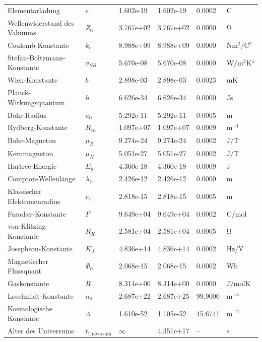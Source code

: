 \documentclass[12pt,a4paper]{report}
\begin{document}
\begin{longtable}{>{\raggedright}p{4.0cm}p{1.2cm}p{1.8cm}p{2.0cm}p{1.6cm}p{2.0cm}}
		Elementarladung & $e$ & 1.602e-19 & 1.602e-19 & 0.0002 & $\si{\coulomb}$ \\
		Wellenwiderstand des Vakuums & $Z_0$ & 3.767e+02 & 3.767e+02 & 0.0000 & $\si{\ohm}$ \\
		Coulomb-Konstante & $k_e$ & 8.988e+09 & 8.988e+09 & 0.0000 & $\si{\newton \meter^2 \per \coulomb^2}$ \\
		Stefan-Boltzmann-Konstante & $\sigma_{SB}$ & 5.670e-08 & 5.670e-08 & 0.0000 & $\si{\watt \per \meter^2 \kelvin^4}$ \\
		Wien-Konstante & $b$ & 2.898e-03 & 2.898e-03 & 0.0023 & $\si{\meter \kelvin}$ \\
		Planck-Wirkungsquantum & $h$ & 6.626e-34 & 6.626e-34 & 0.0000 & $\si{\joule \second}$ \\
		Bohr-Radius & $a_0$ & 5.292e-11 & 5.292e-11 & 0.0005 & $\si{\meter}$ \\
		Rydberg-Konstante & $R_\infty$ & 1.097e+07 & 1.097e+07 & 0.0009 & $\si{\meter^{-1}}$ \\
		Bohr-Magneton & $\mu_B$ & 9.274e-24 & 9.274e-24 & 0.0002 & $\si{\joule \per \tesla}$ \\
		Kernmagneton & $\mu_N$ & 5.051e-27 & 5.051e-27 & 0.0002 & $\si{\joule \per \tesla}$ \\
		Hartree-Energie & $E_h$ & 4.360e-18 & 4.360e-18 & 0.0009 & $\si{\joule}$ \\
		Compton-Wellenlänge & $\lambda_C$ & 2.426e-12 & 2.426e-12 & 0.0000 & $\si{\meter}$ \\
		Klassischer Elektronenradius & $r_e$ & 2.818e-15 & 2.818e-15 & 0.0005 & $\si{\meter}$ \\
		Faraday-Konstante & $F$ & 9.649e+04 & 9.649e+04 & 0.0002 & $\si{\coulomb \per \mole}$ \\
		von-Klitzing-Konstante & $R_K$ & 2.581e+04 & 2.581e+04 & 0.0005 & $\si{\ohm}$ \\
		Josephson-Konstante & $K_J$ & 4.836e+14 & 4.836e+14 & 0.0002 & $\si{\hertz \per \volt}$ \\
		Magnetischer Flussquant & $\Phi_0$ & 2.068e-15 & 2.068e-15 & 0.0002 & $\si{\weber}$ \\
		Gaskonstante & $R$ & 8.314e+00 & 8.314e+00 & 0.0000 & $\si{\joule \per \mole \kelvin}$ \\
		Loschmidt-Konstante & $n_0$ & 2.687e+22 & 2.687e+25 & 99.9000 & $\si{\meter^{-3}}$ \\
		Kosmologische Konstante & $\Lambda$ & 1.610e-52 & 1.105e-52 & 45.6741 & $\si{\meter^{-2}}$ \\
		Alter des Universums & $t_{\text{Universum}}$ & $\infty$ & 4.351e+17 & -- & $\si{\second}$ \\

\end{longtable}
\end{document}
